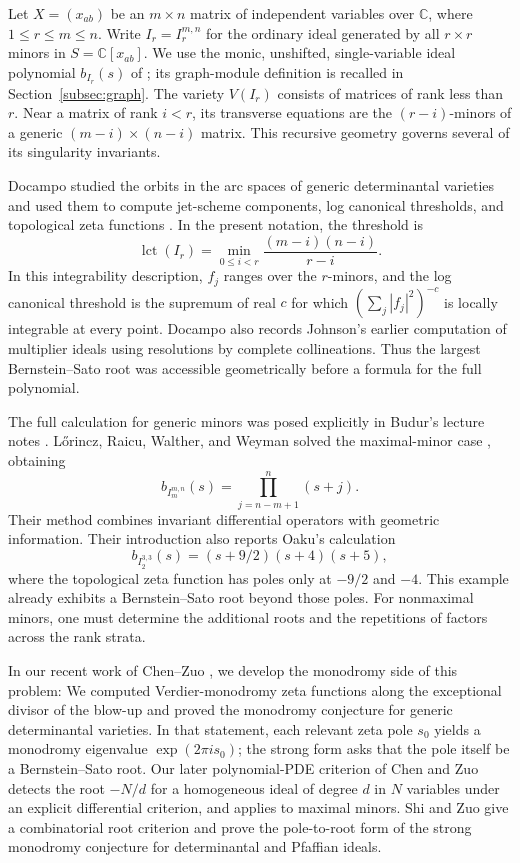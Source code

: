 \documentclass[11pt,a4paper]{article}
\numberwithin{equation}{section}
\theoremstyle{definition}
\newcommand{\C}{\mathbb C}
\begin{document}
Let $X=(x_{ab})$ be an $m\times n$ matrix of independent variables over
$\C$, where $1\le r\le m\le n$. Write $I_r=I_r^{m,n}$ for the ordinary
ideal generated by all $r\times r$ minors in $S=\C[x_{ab}]$. We use the monic,
unshifted, single-variable ideal polynomial $b_{I_r}(s)$ of \cite{BMS};
its graph-module definition is recalled in Section~\ref{subsec:graph}.
The variety $V(I_r)$ consists of matrices of rank less than $r$.
Near a matrix of rank $i<r$, its transverse equations are the
$(r-i)$-minors of a generic $(m-i)\times(n-i)$ matrix. This recursive
geometry governs several of its singularity invariants.

Docampo studied the orbits in the arc spaces of generic determinantal
varieties and used them to compute jet-scheme components, log
canonical thresholds, and topological zeta functions \cite{Docampo}.
In the present notation, the threshold is
\[
\operatorname{lct}(I_r)
=\min_{0\le i<r}\frac{(m-i)(n-i)}{r-i}.
\]
In this integrability description, $f_j$ ranges over the $r$-minors, and the log canonical threshold
is the supremum of real $c$ for
which $(\sum_j|f_j|^2)^{-c}$ is locally integrable at every point.
Docampo also records Johnson's earlier computation of multiplier
ideals using resolutions by complete collineations. Thus the
largest Bernstein--Sato root was accessible geometrically before a
formula for the full polynomial.

The full calculation for generic minors was posed explicitly in
Budur's lecture notes \cite[Section~3.11]{BudurNotes}.
L\H orincz, Raicu, Walther, and Weyman solved the maximal-minor case
\cite{LRWW}, obtaining
\[
b_{I_m^{m,n}}(s)=\prod_{j=n-m+1}^{n}(s+j).
\]
Their method combines invariant differential operators with geometric
information. Their introduction also reports Oaku's calculation
\[
b_{I_2^{3,3}}(s)=(s+9/2)(s+4)(s+5),
\]
where the topological zeta function has poles only at $-9/2$ and $-4$.
This example already exhibits a Bernstein--Sato root beyond those
poles. For nonmaximal minors, one must determine the additional
roots and the repetitions of factors across the rank strata.

In our recent work of Chen–Zuo \cite{CZ25}, we develop the monodromy side of this
problem: We computed Verdier-monodromy zeta functions
along the exceptional divisor of the blow-up and proved the monodromy
conjecture for generic determinantal varieties. In that statement,
each relevant zeta pole $s_0$ yields a monodromy eigenvalue
$\exp(2\pi i s_0)$; the strong form asks that the pole itself be a
Bernstein--Sato root. Our later polynomial-PDE criterion of Chen and Zuo
\cite{CZPDE} detects the root $-N/d$ for a homogeneous ideal of
degree $d$ in $N$ variables under an explicit differential criterion,
and applies to maximal minors. Shi and Zuo \cite{SZ} give a
combinatorial root criterion and prove the pole-to-root form of the strong monodromy conjecture
for determinantal and Pfaffian ideals.
\end{document}
